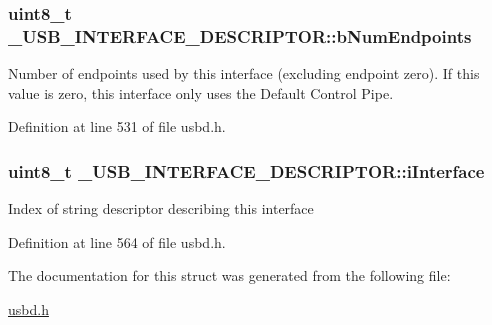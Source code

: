 \subsubsection[{\texorpdfstring{b\+Num\+Endpoints}{bNumEndpoints}}]{\setlength{\rightskip}{0pt plus 5cm}uint8\+\_\+t \+\_\+\+U\+S\+B\+\_\+\+I\+N\+T\+E\+R\+F\+A\+C\+E\+\_\+\+D\+E\+S\+C\+R\+I\+P\+T\+O\+R\+::b\+Num\+Endpoints}\hypertarget{struct__USB__INTERFACE__DESCRIPTOR_a9972081626557a77abd11258cc75684b}{}\label{struct__USB__INTERFACE__DESCRIPTOR_a9972081626557a77abd11258cc75684b}
Number of endpoints used by this interface (excluding endpoint zero). If this value is zero, this interface only uses the Default Control Pipe. 

Definition at line 531 of file usbd.\+h.

\subsubsection[{\texorpdfstring{i\+Interface}{iInterface}}]{\setlength{\rightskip}{0pt plus 5cm}uint8\+\_\+t \+\_\+\+U\+S\+B\+\_\+\+I\+N\+T\+E\+R\+F\+A\+C\+E\+\_\+\+D\+E\+S\+C\+R\+I\+P\+T\+O\+R\+::i\+Interface}\hypertarget{struct__USB__INTERFACE__DESCRIPTOR_a69b79c8ff54fe5c4ce9e0517923332a5}{}\label{struct__USB__INTERFACE__DESCRIPTOR_a69b79c8ff54fe5c4ce9e0517923332a5}
Index of string descriptor describing this interface 

Definition at line 564 of file usbd.\+h.



The documentation for this struct was generated from the following file\+:\begin{DoxyCompactItemize}
\item 
\hyperlink{usbd_8h}{usbd.\+h}\end{DoxyCompactItemize}
